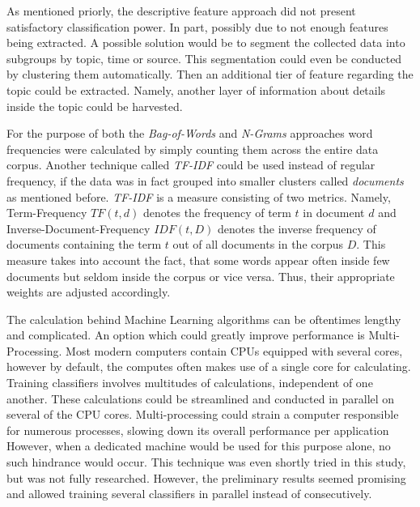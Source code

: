 		\par 
		
		As mentioned priorly, the descriptive feature approach did not present satisfactory classification power. In part, possibly due to not enough features being extracted. A possible solution would be to segment the collected data into subgroups by topic, time or source. This segmentation could even be conducted by clustering them automatically. Then an additional tier of feature regarding the topic could be extracted. Namely, another layer of information about details inside the topic could be harvested.
		
		\par 
		
		For the purpose of both the \textit{Bag-of-Words} and \textit{N-Grams} approaches word frequencies were calculated by simply counting them across the entire data corpus. Another technique called \textit{TF-IDF} could be used instead of regular frequency, if the data was in fact grouped into smaller clusters called \textit{documents} as mentioned before. \textit{TF-IDF} is a measure consisting of two metrics. Namely, Term-Frequency $ TF(t,d) $ denotes the frequency of term $ t $ in document $ d $ and Inverse-Document-Frequency $ IDF(t,D) $ denotes the inverse frequency of documents containing the term $ t $ out of all documents in the corpus $ D $. This measure takes into account the fact, that some words appear often inside few documents but seldom inside the corpus or vice versa. Thus, their appropriate weights are adjusted accordingly.
		
		\par 
		
		The calculation behind Machine Learning algorithms can be oftentimes lengthy and complicated. An option which could greatly improve performance is Multi-Processing. Most modern computers contain CPUs equipped with several cores, however by default, the computes often makes use of a single core for calculating. Training classifiers involves multitudes of calculations, independent of one another. These calculations could be streamlined and conducted in parallel on several of the CPU cores. Multi-processing could strain a computer responsible for numerous processes, slowing down its overall performance per application However, when a dedicated machine would be used for this purpose alone, no such hindrance would occur. This technique was even shortly tried in this study, but was not fully researched. However, the preliminary results seemed promising and allowed training several classifiers in parallel instead of consecutively.